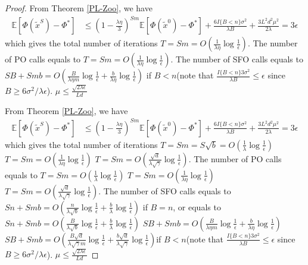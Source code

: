 \documentclass{article}
\newcommand*{\E}{\mathbb{E}}
\theoremstyle{definition}
\theoremstyle{remark}
\begin{document}
\begin{proof}
From Theorem \ref{PL-Zoo}, we have
\begin{align}
\E[\Phi(\widetilde{x}^S) - {\Phi}^*] & \leq   \left(1-\frac{\lambda\eta}{3}\right)^{Sm} \E[\Phi(\widetilde{x}^0) - {\Phi}^*] + \frac{6I\{B < n\} \sigma ^2}{\lambda B}+\frac{3 L^2 d^2 \mu^2}{2\lambda}= 3 \epsilon
\end{align}
which gives the total number of iterations {\color{Brown} $T = Sm = O(\frac{1}{\lambda\eta}\log\frac{1}{\epsilon})$}. The number of PO calls equals to {\color{Brown} $T = Sm = O(\frac{1}{\lambda\eta}\log\frac{1}{\epsilon})$}. The number of SFO calls equals to {\color{Brown}$SB+Smb = O(\frac{B}{\lambda\eta m}\log\frac{1}{\epsilon}+\frac{b}{\lambda\eta}\log\frac{1}{\epsilon})$} if $B < n$(note that $\frac{I\{B < n\}3 \sigma ^2}{\lambda B} \leq \epsilon$ since $B \geq 6 {\sigma ^2}/{\lambda \epsilon}$).
{\color{blue} $\mu \leq \frac{\sqrt{2\lambda\epsilon}}{L d}$}

From Theorem \ref{PL-Zoo}, we have
\begin{align}
\E[\Phi(\widetilde{x}^S) - {\Phi}^*] & \leq   \left(1-\frac{\lambda\eta}{3}\right)^{Sm} \E[\Phi(\widetilde{x}^0) - {\Phi}^*] + \frac{6I\{B < n\} \sigma ^2}{\lambda B}+\frac{3 L^2 d^2 \mu^2}{2\lambda}= 3 \epsilon
\end{align}
which gives the total number of iterations $T = Sm = S\sqrt{b} = O(\frac{1}{\lambda}\log\frac{1}{\epsilon})$ {\color{Brown} $T = Sm = O(\frac{1}{\lambda\eta}\log\frac{1}{\epsilon})$} {\color{Blue} $T = Sm = O(\frac{\sqrt{d}}{\lambda\sqrt{\gamma}}\log\frac{1}{\epsilon})$}. The number of PO calls equals to $T = Sm = O(\frac{1}{\lambda}\log\frac{1}{\epsilon})$ {\color{Brown} $T = Sm = O(\frac{1}{\lambda\eta}\log\frac{1}{\epsilon})$} {\color{Blue} $T = Sm = O(\frac{\sqrt{d}}{\lambda\sqrt{\gamma}}\log\frac{1}{\epsilon})$}. The number of SFO calls equals to $Sn+Smb = O(\frac{n}{\lambda \sqrt{b}}\log\frac{1}{\epsilon}+\frac{b}{\lambda}\log\frac{1}{\epsilon})$ if $B = n$, or equals to  $Sn+Smb = O(\frac{B}{\lambda \sqrt{b}}\log\frac{1}{\epsilon}+\frac{b}{\lambda}\log\frac{1}{\epsilon})$ {\color{Brown}$SB+Smb = O(\frac{B}{\lambda\eta m}\log\frac{1}{\epsilon}+\frac{b}{\lambda\eta}\log\frac{1}{\epsilon})$} {\color{blue}$SB+Smb = O(\frac{B\sqrt{d}}{\lambda\sqrt{\gamma} m}\log\frac{1}{\epsilon}+\frac{b\sqrt{d}}{\lambda\sqrt{\gamma}}\log\frac{1}{\epsilon})$}if $B < n$(note that $\frac{I\{B < n\}3 \sigma ^2}{\lambda B} \leq \epsilon$ since $B \geq 6 {\sigma ^2}/{\lambda \epsilon}$).
{\color{blue} $\mu \leq \frac{\sqrt{2\lambda\epsilon}}{L d}$}
\end{proof}
\end{document}
